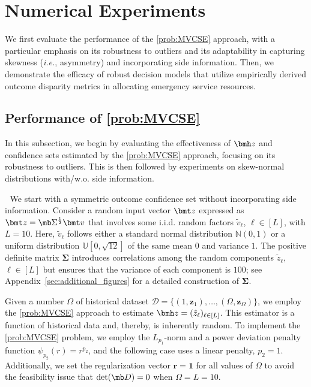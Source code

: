 \documentclass[opre, blindrev]{informs4}
\newcommand{\1}[1]{\mathds{1}{\left(#1\right)}}
\begin{document}
\section{Numerical Experiments}
\label{sec:case_study}
We first evaluate the performance of the \ref{prob:MVCSE} approach, 
with a particular emphasis on its robustness to outliers and its adaptability in capturing skewness (\textit{i.e.}, asymmetry) and incorporating side information. Then, we demonstrate the efficacy of robust decision models that utilize empirically derived outcome disparity metrics in allocating emergency service resources.

\subsection*{Performance of \ref{prob:MVCSE}}
In this subsection, we begin by evaluating the effectiveness of $\bmh z$ and confidence sets estimated by the \ref{prob:MVCSE} approach, focusing on its robustness to outliers. This is then followed by experiments on skew-normal distributions with/w.o. side information.

\medskip
{} $\;$
We start with a symmetric outcome confidence set without incorporating side information. Consider a random input vector $\bmt z$ expressed as $\bmt z = \mb \Sigma^{\frac{1}{2}} \bmt v$ that involves some i.i.d. random factors $\tilde v_\ell$, $\ell \in [L]$, with $L = 10$. Here, $\tilde v_\ell$ follows either a standard normal distribution $\mathbb{N}(0,1)$ or a uniform distribution $\mathbb{U}[0,\sqrt{12}]$ of the same mean $0$ and variance $1$. The positive definite matrix $\bm \Sigma$ introduces correlations among the random components $\tilde z_\ell$, $\ell \in [L]$ but ensures that the variance of each component is $100$; see Appendix~\ref{sec:additional_figures} for a detailed construction of $\bm \Sigma$. 

Given a number $\Omega$ of historical dataset $\mathcal{D} = \{(1,\bm z_1), \dots, (\Omega,\bm z_\Omega)\}$, we employ the \ref{prob:MVCSE} approach to estimate $\bmh z = (\hat z_\ell)_{\ell \in [L]}$. This estimator is a function of historical data and, thereby, is inherently random. To implement the \ref{prob:MVCSE} problem, we employ the $L_{p_1}$-norm and a power deviation penalty function $\psi_{p_2}(r) = r^{p_2}$, and the following case uses a linear penalty, \ie $p_2 =1$. Additionally, we set the regularization vector $\bm r = \bm 1$ for all values of $\Omega$ to avoid the feasibility issue that $\det(\mb D) = 0$ when $\Omega = L = 10$.
\end{document}
